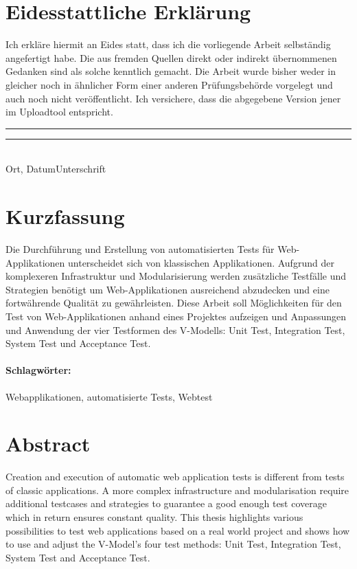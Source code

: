 \documentclass[a4paper,bibtotoc,oneside]{scrbook}
\begin{document}
\newpage


\section*{Eidesstattliche Erklärung}\thispagestyle{empty}
\glqq Ich erkläre hiermit an Eides statt, dass ich die vorliegende Arbeit selbständig angefertigt habe. 
Die aus fremden Quellen direkt oder indirekt übernommenen Gedanken sind als solche kenntlich gemacht. 
Die Arbeit wurde bisher weder in gleicher noch in ähnlicher Form einer anderen Prüfungsbehörde vorgelegt
und auch noch nicht veröffentlicht. Ich versichere, dass die abgegebene Version jener im Uploadtool entspricht.\grqq\\[5\baselineskip]
\rule{5cm}{0.2pt}\hfill\rule{5cm}{0.2pt}\\
\phantom{Datum }Ort, Datum\hfill Unterschrift\hspace{15mm}

\newpage


\section*{Kurzfassung}\thispagestyle{empty}
Die Durchführung und Erstellung von automatisierten Tests für Web-Applikationen unterscheidet sich von klassischen Applikationen. Aufgrund der komplexeren Infrastruktur und Modularisierung werden zusätzliche Testfälle und Strategien benötigt um Web-Applikationen ausreichend abzudecken und eine fortwährende Qualität zu gewährleisten. Diese Arbeit soll Möglichkeiten für den Test von Web-Applikationen anhand eines Projektes aufzeigen und Anpassungen und Anwendung der vier Testformen des V-Modells: Unit Test, Integration Test, System Test und Acceptance Test. 

\vfill
\paragraph*{Schlagwörter:} Webapplikationen, automatisierte Tests, Webtest


\newpage

\section*{Abstract}\thispagestyle{empty}
Creation and execution of automatic web application tests is different from tests of classic applications. A more complex infrastructure and modularisation require additional testcases and strategies to guarantee a good enough test coverage which in return ensures constant quality. This thesis highlights various possibilities to test web applications based on a real world project and shows how to use and adjust the V-Model's four test methods: Unit Test, Integration Test, System Test and Acceptance Test.
\end{document}
